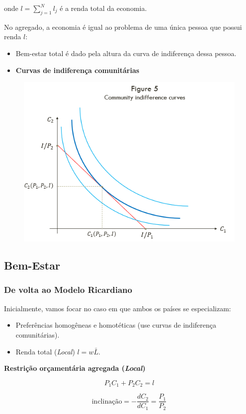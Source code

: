 \documentclass[a4paper,12pt]{article}[abntex2]
\begin{document}
onde \( l = \sum_{j=1}^{N} l_j \) é a renda total da economia.

No agregado, a economia é igual ao problema de uma única pessoa que possui renda \( l \):

\begin{itemize}
    \item Bem-estar total é dado pela altura da curva de indiferença dessa pessoa.
    \item \textbf{Curvas de indiferença comunitárias}
\end{itemize}

\begin{figure}[H]
    \centering
    \includegraphics[width=0.7\linewidth]{Imagens/a9i5.png}
\end{figure}

\subsection{\textbf{Bem-Estar}}
\subsubsection{\textbf{De volta ao Modelo Ricardiano}}
Inicialmente, vamos focar no caso em que ambos os países se especializam:

\begin{itemize}
    \item Preferências homogêneas e homotéticas (use curvas de indiferença comunitárias).
    \item Renda total (\textit{Local}) \( l = w \bar{L} \).
\end{itemize}

\textbf{Restrição orçamentária agregada (\textit{Local})}

\[
P_1 C_1 + P_2 C_2 = l
\]

\[
\text{inclinação} = -\frac{dC_2}{dC_1} = \frac{P_1}{P_2}
\]
\end{document}
